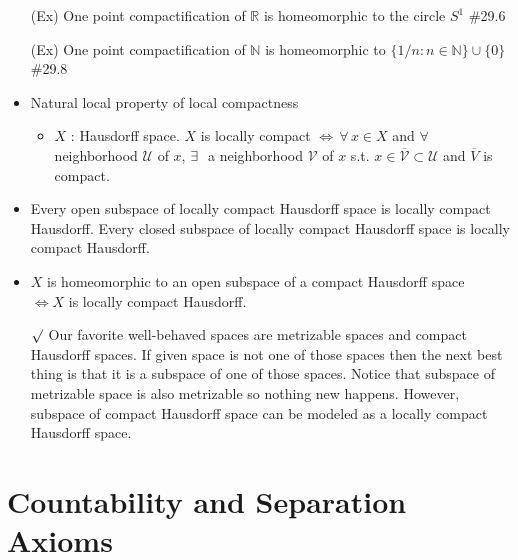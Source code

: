 \documentclass[12pt]{article}
\newcommand{\rmk}{$\surd$}
\newcommand{\spone}{\hspace{0.1cm}}
\newcommand{\Nat}{\mathbb{N}}
\newcommand{\Real}{\mathbb{R}}
\newcommand{\U}{\mathcal{U}}
\newcommand{\V}{\mathcal{V}}
\newcommand{\cl}{\overline}
\newcommand{\exist}{\exists\spone}
\begin{document}
\begin{itemize}
	\item[(Ex)]One point compactification of $\Real$ is homeomorphic to the circle $S^1$ \quad \#29.6
	\item[(Ex)]One point compactification of $\Nat$ is homeomorphic to $\{1/n : n\in \Nat\}\cup \{0\}$ \quad \#29.8
	\item Natural local property of local compactness
	\begin{itemize}
		\item $X$ : Hausdorff space. $X$ is locally compact $\Leftrightarrow \, \forall \, x\in X$ and $\forall\,$ neighborhood $\U$ of $x$, $\exist$ a neighborhood $\V$ of $x$ s.t. $x\in \cl{\V}\subset \U$ and $\cl{V}$ is compact.
	\end{itemize}
	\item Every open subspace of locally compact Hausdorff space is locally compact Hausdorff. Every closed subspace of locally compact Hausdorff space is locally compact Hausdorff.
	\item $X$ is homeomorphic to an open subspace of a compact Hausdorff space\\ $\Leftrightarrow X$ is locally compact Hausdorff.
	\item[\rmk] Our favorite well-behaved spaces are metrizable spaces and compact Hausdorff spaces. If given space is not one of those spaces then the next best thing is that it is a subspace of one of those spaces. Notice that subspace of metrizable space is also metrizable so nothing new happens. However, subspace of compact Hausdorff space can be modeled as a locally compact Hausdorff space.
\end{itemize}
\clearpage

\section{Countability and Separation Axioms}
\bigskip
\end{document}
